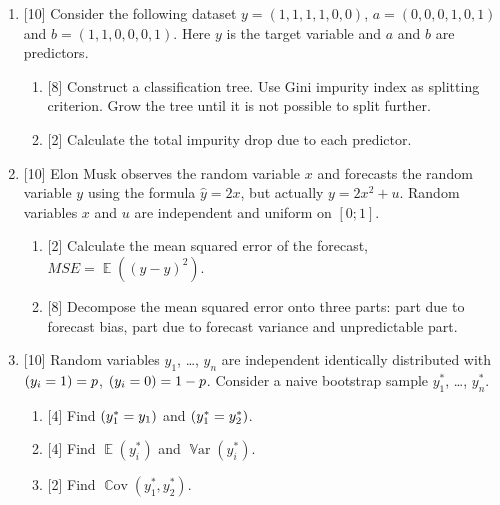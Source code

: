 \documentclass[12pt]{article}
\DeclareMathOperator{\Cov}{\mathbb{C}ov}
\DeclareMathOperator{\Var}{\mathbb{V}ar}
\let\P\relax
\DeclareMathOperator{\P}{\mathbb{P}}
\DeclareMathOperator{\E}{\mathbb{E}}
\begin{document}
\begin{enumerate}
\item {[10]} Consider the following dataset $y = (1, 1, 1, 1, 0, 0)$, $a = (0, 0, 0, 1, 0, 1)$ and $b=(1, 1, 0, 0, 0, 1)$.
Here $y$ is the target variable and $a$ and $b$ are predictors. 

\begin{enumerate}
    \item {[8]} Construct a classification tree. 
    Use Gini impurity index as splitting criterion. 
    Grow the tree until it is not possible to split further. 
    \item {[2]} Calculate the total impurity drop due to each predictor. 
\end{enumerate}



\item {[10]} Elon Musk observes the random variable $x$ and forecasts the random variable $y$ using the formula $\hat y = 2 x$, but actually $y = 2 x^2 + u$.
Random variables $x$ and $u$ are independent and uniform on $[0;1]$.

\begin{enumerate}
    \item {[2]} Calculate the mean squared error of the forecast, $MSE = \E((y - \hat y)^2 )$.
    \item {[8]} Decompose the mean squared error onto three parts: part due to forecast bias, part due to forecast variance and unpredictable part. 
\end{enumerate}


\item {[10]} Random variables $y_1$, \dots, $y_n$ are independent identically distributed with $\P(y_i = 1) = p$, $\P(y_i = 0) = 1 - p$. 
Consider a naive bootstrap sample $y_1^*$, \dots, $y_n^*$.
\begin{enumerate}
    \item {[4]} Find $\P(y_1^* = y_1)$ and $\P(y_1^* = y_2^*)$.
    \item {[4]} Find $\E(y_i^*)$ and $\Var(y_i^*)$.
    \item {[2]} Find $\Cov(y_1^*, y_2^*)$.
\end{enumerate}


\end{enumerate}
\end{document}
